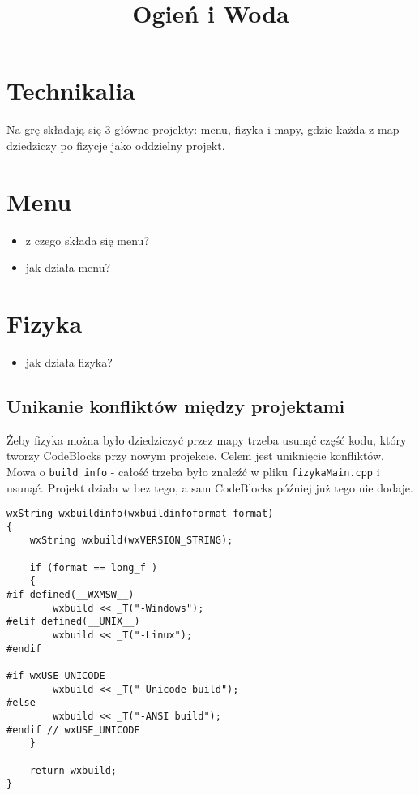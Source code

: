 \documentclass[10pt]{article}
\title{Ogień i Woda}
\author{}
\date{}
\begin{document}
\maketitle

\section*{Technikalia}
Na grę składają się 3 główne projekty: menu, fizyka i mapy, gdzie każda z map dziedziczy po fizycje jako oddzielny projekt.


\section*{Menu}
\begin{itemize}
  \item z czego składa się menu?

  \item jak działa menu?

\end{itemize}

\section*{Fizyka}
\begin{itemize}
  \item jak działa fizyka?
\end{itemize}

\subsection*{Unikanie konfliktów między projektami}
Żeby fizyka można było dziedziczyć przez mapy trzeba usunąć część kodu, który tworzy CodeBlocks przy nowym projekcie. Celem jest uniknięcie konfliktów. Mowa o \texttt{build info} - całość trzeba było znaleźć w pliku \texttt{fizykaMain.cpp} i usunąć. Projekt działa w bez tego, a sam CodeBlocks później już tego nie dodaje.

\begin{verbatim}
wxString wxbuildinfo(wxbuildinfoformat format)
{
    wxString wxbuild(wxVERSION_STRING);

    if (format == long_f )
    {
#if defined(__WXMSW__)
        wxbuild << _T("-Windows");
#elif defined(__UNIX__)
        wxbuild << _T("-Linux");
#endif

#if wxUSE_UNICODE
        wxbuild << _T("-Unicode build");
#else
        wxbuild << _T("-ANSI build");
#endif // wxUSE_UNICODE
    }

    return wxbuild;
}
\end{verbatim}
\end{document}
